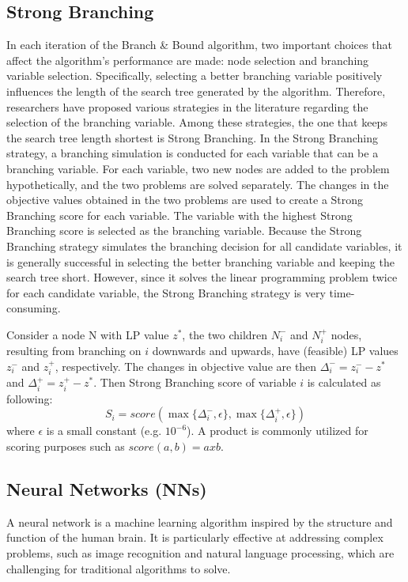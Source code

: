 \subsection{Strong Branching}\label{subsec:strong-branching}
In each iteration of the Branch \& Bound algorithm, two important choices that affect the algorithm's performance are made: node selection and branching variable selection.
Specifically, selecting a better branching variable positively influences the length of the search tree generated by the algorithm.
Therefore, researchers have proposed various strategies in the literature regarding the selection of the branching variable.
Among these strategies, the one that keeps the search tree length shortest is Strong Branching.
In the Strong Branching strategy, a branching simulation is conducted for each variable that can be a branching variable.
For each variable, two new nodes are added to the problem hypothetically, and the two problems are solved separately.
The changes in the objective values obtained in the two problems are used to create a Strong Branching score for each variable.
The variable with the highest Strong Branching score is selected as the branching variable.
Because the Strong Branching strategy simulates the branching decision for all candidate variables, it is generally successful in selecting the better branching variable and keeping the search tree short.
However, since it solves the linear programming problem twice for each candidate variable, the Strong Branching strategy is very time-consuming.

Consider a node N with LP value $z^*$, the two children $N_i^-$ and $N_i^+$ nodes, resulting from branching on $i$ downwards and upwards, have (feasible) LP values $z_i^-$ and $z_i^+$, respectively.
The changes in objective value are then $\Delta_i^- = z_i^- - z^* $  and $\Delta_i^+ = z_i^+ - z^* $.
Then Strong Branching score of variable $i$ is calculated as following: $$S_i = score (\max \{\Delta_i^-, \epsilon\}, \max \{\Delta_i^+, \epsilon\}) $$
where $\epsilon$ is a small constant (e.g. $10^{-6}$). A product is commonly utilized for scoring purposes such as $score(a, b) = a x b$.


\subsection{Neural Networks (NNs)}\label{subsec:neural-networks-(nns)}
A neural network is a machine learning algorithm inspired by the structure and function of the human brain.
It is particularly effective at addressing complex problems, such as image recognition and natural language processing, which are challenging for traditional algorithms to solve.


